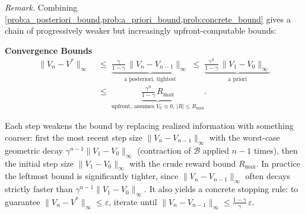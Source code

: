 \documentclass[11pt]{article}
\begin{document}

\emph{Remark.} Combining \cref{prob:a_posteriori_bound,prob:a_priori_bound,prob:concrete_bound} gives a chain of progressively weaker but increasingly upfront-computable bounds:

\begin{callout}[note]
\textbf{Convergence Bounds}
\begin{align*}
\|V_n - V^*\|_\infty
\;&\le\; \underbrace{\tfrac{\gamma}{1-\gamma}\, \|V_n - V_{n-1}\|_\infty}_{\text{a~posteriori, tightest}}
\;\le\; \underbrace{\tfrac{\gamma^n}{1-\gamma}\, \|V_1 - V_0\|_\infty}_{\text{a~priori}} \\
\;&\le\; \underbrace{\tfrac{\gamma^n}{1-\gamma}\, R_{\max}}_{\text{upfront, assumes } V_0 \equiv 0,\, |R| \le R_{\max}}.
\end{align*}
\end{callout}
Each step weakens the bound by replacing realized information with something coarser: first the most recent step size $\|V_n - V_{n-1}\|_\infty$ with the worst-case geometric decay $\gamma^{n-1}\|V_1 - V_0\|_\infty$ (contraction of $\mathcal{B}$ applied $n-1$ times), then the initial step size $\|V_1 - V_0\|_\infty$ with the crude reward bound $R_{\max}$. In practice the leftmost bound is significantly tighter, since $\|V_n - V_{n-1}\|_\infty$ often decays strictly faster than $\gamma^{n-1}\|V_1 - V_0\|_\infty$. It also yields a concrete stopping rule: to guarantee $\|V_n - V^*\|_\infty \le \varepsilon$, iterate until $\|V_n - V_{n-1}\|_\infty \le \frac{1-\gamma}{\gamma}\, \varepsilon$.

\end{document}

